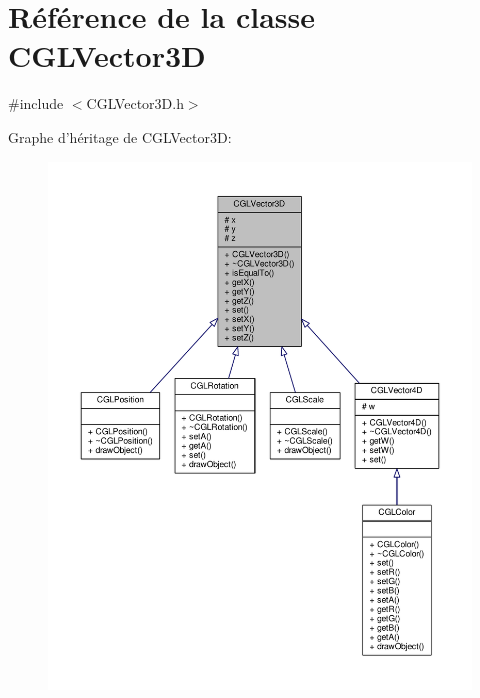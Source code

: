 \hypertarget{class_c_g_l_vector3_d}{\section{Référence de la classe C\-G\-L\-Vector3\-D}
\label{class_c_g_l_vector3_d}
}


{\ttfamily \#include $<$C\-G\-L\-Vector3\-D.\-h$>$}



Graphe d'héritage de C\-G\-L\-Vector3\-D\-:\nopagebreak
\begin{figure}[H]
\begin{center}
\leavevmode
\includegraphics[width=350pt]{d0/d49/class_c_g_l_vector3_d__inherit__graph}
\end{center}
\end{figure}


